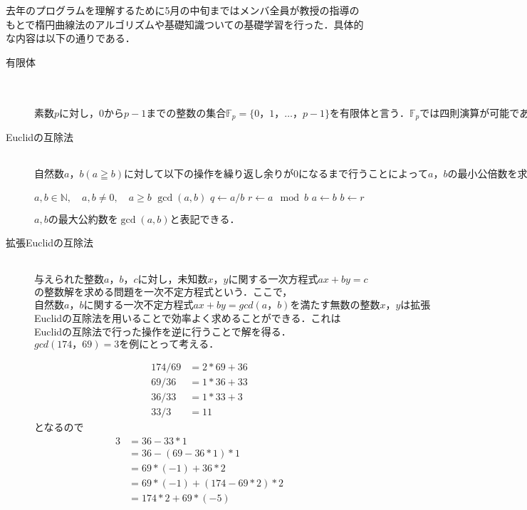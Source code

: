 \documentclass[openany,11pt,papersize]{jsbook}
\begin{document}
去年のプログラムを理解するために5月の中旬まではメンバ全員が教授の指導のもとで楕円曲線法のアルゴリズムや基礎知識ついての基礎学習を行った．具体的な内容は以下の通りである．
\begin{description}
 \item[有限体]\mbox{}\\ 
	    　　$素数pに対し，0からp-1までの整数の集合\mathbb{F}_p=\{0，1，…，p-1\}を有限体と言う．\mathbb{F}_pでは四則演算が可能であり，ECMではこの範囲で考える．$
 \item[Euclidの互除法]\mbox{}\\
		$自然数a，b(a≧b)に対して以下の操作を繰り返し余りが0になるまで行うことによってa，bの最小公倍数を求めるものである．$

%
%
%
%
\begin{algorithm}[h]                   
\caption{Euclidean Algorithm}
\label{alg E}                          
\begin{algorithmic}                  
\REQUIRE $a,b \in \mathbb{N} , \quad a,b \neq 0,\quad a\ge b$
\ENSURE $\gcd (a,b)$
\STATE $q \leftarrow a/b$
\STATE $r \leftarrow a\mod b$
\STATE $a \leftarrow b$
\STATE $b \leftarrow r$
\ENDWHILE
\end{algorithmic}
\end{algorithm}
$a,bの最大公約数を\gcd (a,b)と表記できる．$
	
 \item[拡張Euclidの互除法]\mbox{}\\
	$与えられた整数a，b，cに対し，未知数x，yに関する一次方程式ax+by=c$の整数解を求める問題を一次不定方程式という．ここで，$自然数a，bに関する一次不定方程式ax+by=gcd(a，b)を満たす無数の整数x，yは拡張$Euclidの互除法を用いることで効率よく求めることができる．これはEuclidの互除法で行った操作を逆に行うことで解を得る．$gcd(174，69)=3を例にとって考える．$

	\begin{align*} 
		174/69&=2*69+36 \\
		69/36&=1*36+33　\\
		36/33&=1*33+3 \\
		33/3&=11 	
 	\end{align*}
	となるので
	\begin{align*} 
	3&=36-33*1 \\
	&=36-(69-36*1)*1 \\
	&=69*(-1)+36*2 \\
	&=69*(-1)+(174-69*2)*2 \\
	&=174*2+69*(-5)
 	\end{align*}


\end{description}
\end{document}
